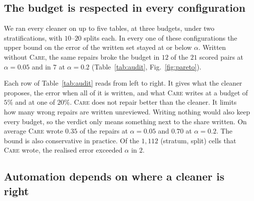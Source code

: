 \documentclass[sigconf, nonacm, balance=false]{acmart}
\theoremstyle{remark}
\begin{document}
\subsection{The budget is respected in every configuration}
\label{sec:coverage}
We ran every cleaner on up to five tables, at three budgets, under two stratifications, with
$10$--$20$ splits each. In every one of these configurations the upper bound on the
error of the written set stayed at or below $\alpha$. Written without \textsc{Care},
the same repairs broke the budget in $12$ of the $21$ scored pairs at $\alpha=0.05$
and in $7$ at $\alpha=0.2$ (Table~\ref{tab:audit}, Fig.~\ref{fig:pareto}).

Each row of Table~\ref{tab:audit} reads from left to right. It gives what the cleaner
proposes, the error when all of it is written, and what \textsc{Care} writes at a
budget of $5\%$ and at one of $20\%$. \textsc{Care} does not repair better than the
cleaner. It limits how many wrong repairs are written unreviewed. Writing
nothing would also keep every budget, so the verdict only means something next to the
share written. On average \textsc{Care} wrote $0.35$ of the repairs at
$\alpha=0.05$ and $0.70$ at $\alpha=0.2$. The bound is also conservative in practice.
Of the $1{,}112$ (stratum, split) cells that \textsc{Care} wrote, the realised error
exceeded $\alpha$ in $2$.

\begin{table}[t]
  \centering  \caption{Every scored cleaner--table pair, without and with \textsc{Care}.
  \textsc{Care} changes no repair. It selects which repairs are written without review.
  $n$ is the number of repairs on true error cells, acc.\ their accuracy, overwr.\ the
  correct cells the cleaner rewrote, \emph{error} the share of wrong values among those
  written, and \emph{written} the share $A(\alpha)$ of repairs written without review.
  Red marks a budget that is broken and green one that is kept. Bold marks where
  \textsc{Care} keeps a budget that writing everything breaks. $\dagger$ is an exactly
  correct cleaner. GIDCL is scored over every cell it wrote, and Baran's rows are medians
  over six draws.}
  \label{tab:audit}
  
\end{table}

\subsection{Automation depends on where a cleaner is right}
\label{sec:sep}
\end{document}

